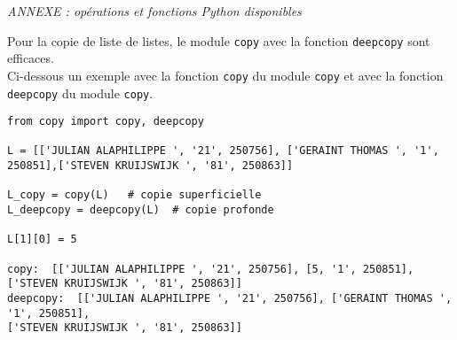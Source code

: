 \vspace{1cm}


\textit{ANNEXE : opérations et fonctions Python disponibles}


Pour la copie de liste de listes, le module \texttt{copy} avec la fonction \texttt{deepcopy} sont efficaces.\\
Ci-dessous un exemple avec la fonction \texttt{copy} du module \texttt{copy} et avec la fonction \texttt{deepcopy} du module \texttt{copy}.

\begin{lstlisting}
from copy import copy, deepcopy

L = [['JULIAN ALAPHILIPPE ', '21', 250756], ['GERAINT THOMAS ', '1', 250851],['STEVEN KRUIJSWIJK ', '81', 250863]]

L_copy = copy(L)   # copie superficielle
L_deepcopy = deepcopy(L)  # copie profonde

L[1][0] = 5

copy:  [['JULIAN ALAPHILIPPE ', '21', 250756], [5, '1', 250851],
['STEVEN KRUIJSWIJK ', '81', 250863]]
deepcopy:  [['JULIAN ALAPHILIPPE ', '21', 250756], ['GERAINT THOMAS ', '1', 250851],
['STEVEN KRUIJSWIJK ', '81', 250863]]
\end{lstlisting}









